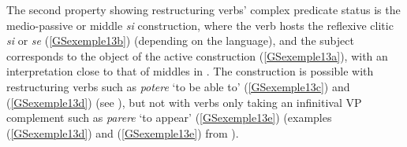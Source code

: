  \label{GSexemple12b} 

 \label{GSexemple12c} 
		
\label{GSexemple12d} 
		
\label{GSexemple12e} 
	
\label{GSexemple12f}
		
\label{GSexemple12g} 
	
\label{GSexemple12h} 
\zl

The second property showing restructuring verbs' complex predicate status is the medio-passive or middle \emph{si} construction, where the verb hosts the reflexive clitic \emph{si} or \emph{se} (\ref{GSexemple13b}) (depending on the language), and the subject corresponds to the object of the active construction (\ref{GSexemple13a}), with an interpretation close to that of middles in . The construction is possible with restructuring verbs such as \emph{potere} `to be able to' (\ref{GSexemple13c}) and (\ref{GSexemple13d}) (see \citealt[333--336]{Monachesi98a}), but not with verbs only taking an infinitival VP complement such as \emph{parere} `to appear' (\ref{GSexemple13e}) (examples (\ref{GSexemple13d}) and (\ref{GSexemple13e}) from \citealt[122]{AG2010}).


